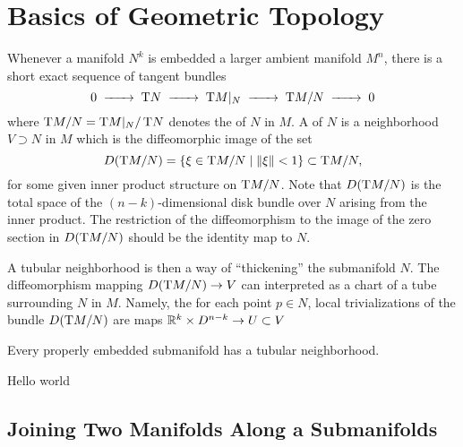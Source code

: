 \section{Basics of Geometric Topology}\label{sec:differential-topology}

Whenever a manifold $N^k$ is embedded a larger ambient manifold $M^n$, there is a short exact sequence of tangent bundles
\begin{equation}
	0 \lkxto \T N\lkxto \T M|_N \lkxto \T M/N \lkxto 0
\end{equation}
where $\operatorname{T\!} M/N=\operatorname{T\!} M|_N / \operatorname{T\!} N$ denotes the  of $N$ in $M$. A  of $N$ is a neighborhood $V\supset N$ in $M$ which is the diffeomorphic image of the set
\begin{equation}
	D(\operatorname{T\!} M/N) = \{\xi \in \operatorname{T\!} M/N \mid \|\xi\| <1 \}\subset \operatorname{T\!} M/N,
\end{equation}
for some given inner product structure on $\operatorname{T\!} M/N$. Note that $D(\operatorname{T\!} M/N)$ is the total space of the $(n-k)$-dimensional disk bundle over $N$ arising from the inner product. The restriction of the diffeomorphism to the image of the zero section in $D(\operatorname{T\!} M/N)$ should be the identity map to $N$.

A tubular neighborhood is then a way of ``thickening'' the submanifold $N$.
The diffeomorphism mapping $D(\operatorname{T\!} M/N) \to V$ can interpreted as a chart of a tube surrounding $N$ in $M$. Namely, the for each point $p\in N$, local trivializations of the bundle $D(\operatorname{T\!} M/N)$ are maps $\mathbb{R}^k \times D^{n-k}\to U\subset V$


\begin{theorem}
	Every properly embedded submanifold has a tubular neighborhood.
\end{theorem}

\begin{theorem}
	Hello world
\end{theorem}


\subsection{Joining Two Manifolds Along a Submanifolds}

